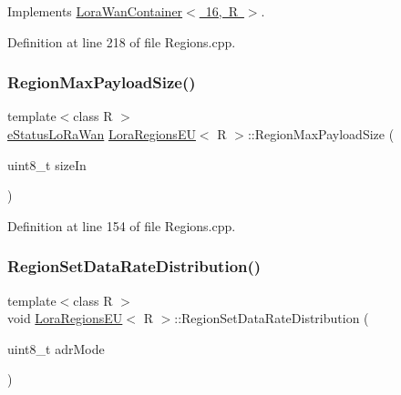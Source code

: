 Implements \mbox{\hyperlink{class_lora_wan_container_a481b6761bc4743086db57fb0adfb4d88}{Lora\+Wan\+Container$<$ 16, R $>$}}.



Definition at line 218 of file Regions.\+cpp.

\mbox{\label{class_lora_regions_e_u_aac8f3f20d2a79717a1c0d26f72e073ef}} 
\subsubsection{\texorpdfstring{Region\+Max\+Payload\+Size()}{RegionMaxPayloadSize()}}
{\footnotesize\ttfamily template$<$class R $>$ \\
\mbox{\hyperlink{_define_8h_a1cea710adbbf5b02bced8f79cd82f7b9}{e\+Status\+Lo\+Ra\+Wan}} \mbox{\hyperlink{class_lora_regions_e_u}{Lora\+Regions\+EU}}$<$ R $>$\+::Region\+Max\+Payload\+Size (\begin{DoxyParamCaption}\item[{uint8\+\_\+t}]{size\+In }\end{DoxyParamCaption})}



Definition at line 154 of file Regions.\+cpp.

\mbox{\label{class_lora_regions_e_u_a94b24cf6b5b8059025cb4e12d03eb97f}} 
\subsubsection{\texorpdfstring{Region\+Set\+Data\+Rate\+Distribution()}{RegionSetDataRateDistribution()}}
{\footnotesize\ttfamily template$<$class R $>$ \\
void \mbox{\hyperlink{class_lora_regions_e_u}{Lora\+Regions\+EU}}$<$ R $>$\+::Region\+Set\+Data\+Rate\+Distribution (\begin{DoxyParamCaption}\item[{uint8\+\_\+t}]{adr\+Mode }\end{DoxyParamCaption})}



